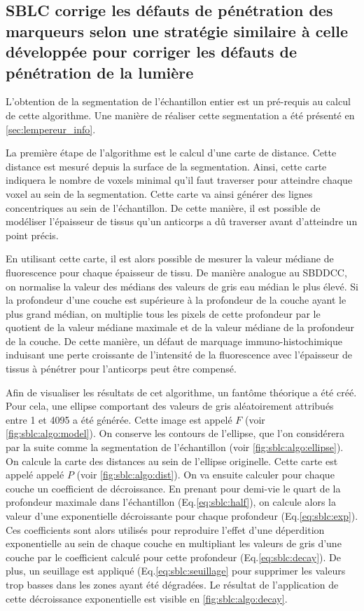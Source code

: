 \documentclass[\main/main.tex]{subfiles}
\begin{document}
    \subsection{SBLC corrige les défauts de pénétration des marqueurs selon une stratégie similaire à celle développée pour corriger les défauts de pénétration de la lumière}
 
%
L'obtention de la segmentation de l'échantillon entier est un pré-requis au calcul de cette algorithme.
%
Une manière de réaliser cette segmentation a été présenté en \autoref{sec:lempereur_info}.

%
La première étape de l'algorithme est le calcul
d'une carte de distance.
%
Cette distance est mesuré depuis la surface de la segmentation.
%
Ainsi, cette carte indiquera le nombre de voxels minimal qu'il faut
traverser pour atteindre chaque voxel au sein de la segmentation.
%
Cette carte va ainsi générer des lignes concentriques au sein de l'échantillon.
%
De cette manière, il est possible de modéliser l'épaisseur de tissus qu'un anticorps a dû traverser avant d'atteindre un point précis.
%

%
En utilisant cette carte, il est alors possible de mesurer la valeur médiane de fluorescence pour chaque épaisseur de tissu.
%
De manière analogue au SBDDCC, on normalise la valeur des médians des valeurs de gris eau médian le plus élevé. Si la profondeur d'une couche est supérieure à la profondeur de la couche ayant le plus grand médian, on multiplie tous les pixels de cette profondeur par le quotient de la valeur médiane maximale et de la valeur médiane de la profondeur de la couche.
%
De cette manière, un défaut de marquage immuno-histochimique 
induisant une perte croissante de l'intensité de la fluorescence avec
l'épaisseur de tissus à pénétrer pour l'anticorps peut être
compensé.

%
Afin de visualiser les résultats de cet algorithme, un fantôme théorique a été créé.
%
Pour cela, une ellipse comportant des valeurs de gris 
aléatoirement attribués entre 1 et 4095 a été générée.
%
Cette image est appelé $F$ (voir \autoref{fig:sblc:algo:model}).
%
On conserve les contours de l'ellipse, que l'on considérera par la suite comme la segmentation de l'échantillon (voir \autoref{fig:sblc:algo:ellipse}).
%
On calcule la carte des distances au sein de l'ellipse originelle.
%
Cette carte est appelé appelé $P$ (voir \autoref{fig:sblc:algo:dist}).
%
On va ensuite calculer pour chaque couche un coefficient de décroissance.
%
En prenant pour demi-vie le quart de la profondeur maximale dans l'échantillon (Eq.\eqref{eq:sblc:half}), on calcule alors la valeur d'une exponentielle décroissante pour chaque profondeur (Eq.\eqref{eq:sblc:exp}).
%
Ces coefficients sont alors utilisés pour reproduire l'effet d'une déperdition exponentielle au sein de chaque couche en multipliant les valeurs de gris d'une couche par le coefficient calculé pour cette profondeur (Eq.\eqref{eq:sblc:decay}).
%
De plus, un seuillage est appliqué (Eq.\eqref{eq:sblc:seuillage} pour supprimer les valeurs trop basses dans les zones ayant été dégradées.
%
Le résultat de l'application de cette décroissance exponentielle est visible en \autoref{fig:sblc:algo:decay}.
\end{document}

